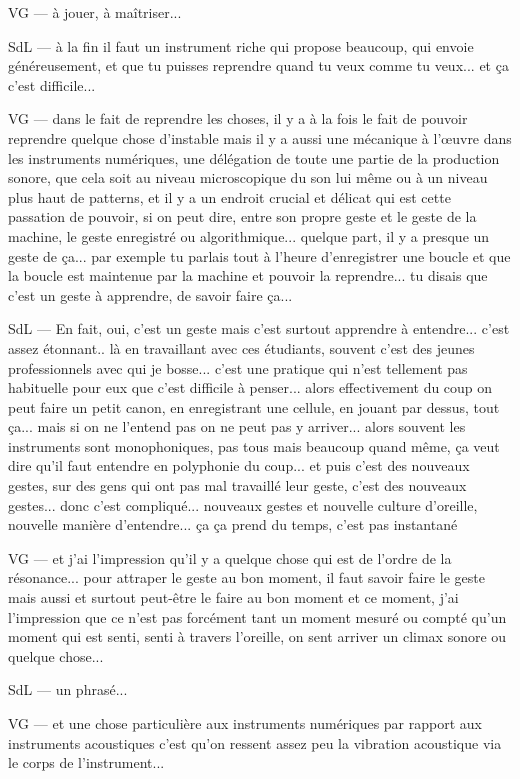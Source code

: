 VG — à jouer, à maîtriser... 

SdL — à la fin il faut un instrument riche qui propose beaucoup, qui envoie généreusement, et que tu puisses reprendre quand tu veux comme tu veux... et ça c'est difficile... 

VG — dans le fait de reprendre les choses, il y a à la fois le fait de pouvoir reprendre quelque chose d'instable mais il y a aussi une mécanique à l'œuvre dans les instruments numériques, une délégation de toute une partie de la production sonore, que cela soit au niveau microscopique du son lui même ou à un niveau plus haut de patterns, et il y a un endroit crucial et délicat qui est cette passation de pouvoir, si on peut dire, entre son propre geste et le geste de la machine, le geste enregistré ou algorithmique... quelque part, il y a presque un geste de ça... par exemple tu parlais tout à l'heure d'enregistrer une boucle et que la boucle est maintenue par la machine et pouvoir la reprendre... tu disais que c'est un geste à apprendre, de savoir faire ça... 

SdL — En fait, oui, c'est un geste mais c'est surtout apprendre à entendre... c'est assez étonnant.. là en travaillant avec ces étudiants, souvent c'est des jeunes professionnels avec qui je bosse... c'est une pratique qui n'est tellement pas habituelle pour eux que c'est difficile à penser... alors effectivement du coup on peut faire un petit canon, en enregistrant une cellule, en jouant par dessus, tout ça... mais si on ne l'entend pas on ne peut pas y arriver... alors souvent les instruments sont monophoniques, pas tous mais beaucoup quand même, ça veut dire qu'il faut entendre en polyphonie du coup... et puis c'est des nouveaux gestes, sur des gens qui ont pas mal travaillé leur geste, c'est des nouveaux gestes... donc c'est compliqué... nouveaux gestes et nouvelle culture d'oreille, nouvelle manière d'entendre... ça ça prend du temps, c'est pas instantané 

VG — et j'ai l'impression qu'il y a quelque chose qui est de l'ordre de la résonance... pour attraper le geste au bon moment, il faut savoir faire le geste mais aussi et surtout peut-être le faire au bon moment et ce moment, j'ai l'impression que ce n'est pas forcément tant un moment mesuré ou compté qu'un moment qui est senti, senti à travers l'oreille, on sent arriver un climax sonore ou quelque chose... 

SdL — un phrasé... 

VG — et une chose particulière aux instruments numériques par rapport aux instruments acoustiques c'est qu'on ressent assez peu la vibration acoustique via le corps de l'instrument... 

